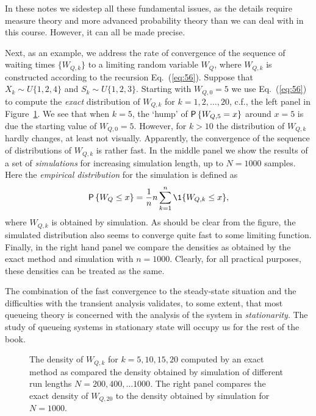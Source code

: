 In these notes we sidestep all these fundamental issues, as the
details require measure theory and more advanced probability theory
than we can deal with in this course. However, it can all be made
precise. 

Next, as an example, we address the rate of convergence of the
sequence of waiting times $\{W_{Q,k}\}$ to a limiting random variable
$W_Q$, where $W_{Q,k}$ is constructed according to the recursion
Eq.~(\ref{eq:56}). Suppose that $X_k\sim U\{1,2,4\}$ and
$S_k\sim U\{1,2,3\}$.  Starting with $W_{Q,0}=5$ we use
Eq.~(\ref{eq:56}) to compute the \emph{exact} distribution of
$W_{Q,k}$ for $k=1,2,\ldots, 20$, c.f., the left panel in
Figure~\ref{fig:convergence}. We see that when $k=5$, the `hump' of
$\P{W_{Q,5}=x}$ around $x=5$ is due the starting value of
$W_{Q,0}=5$. However, for $k>10$ the distribution of $W_{Q,k}$ hardly
changes, at least not visually. Apparently, the convergence of the
sequence of distributions of $W_{Q,k}$ is rather fast. In the middle
panel we show the results of a set of \emph{simulations} for
increasing simulation length, up to $N=1000$ samples. Here the
\emph{empirical distribution} for the simulation is defined as
\begin{equation*}
\P{W_Q\leq x} =   \frac 1n n\sum_{k=1}^n \1{W_{Q,k} \leq x},
\end{equation*}
where $W_{Q,k}$ is obtained by simulation. As should be clear from the
figure, the simulated distribution also seems to converge quite fast to
some limiting function. Finally, in the right hand panel we compare
the densities as obtained by the exact method and simulation with
$n=1000$. Clearly, for all practical purposes, these densities can be
treated as the same.

The combination of the fast convergence to the steady-state situation
and the difficulties with the transient analysis validates, to some
extent, that most queueing theory is concerned with the analysis of
the system in \emph{stationarity}. The study of queueing systems in
stationary state will occupy us for the rest of the book.

\begin{figure}
  \centering



  \caption{The density of $W_{Q,k}$ for $k=5, 10, 15, 20$ computed by
    an exact method as compared the density obtained by simulation of
    different run lengths $N=200, 400, \ldots 1000$. The right panel
    compares the exact density of $W_{Q,20}$ to the density obtained by simulation
    for $N=1000$.}
\label{fig:convergence}
\end{figure}




